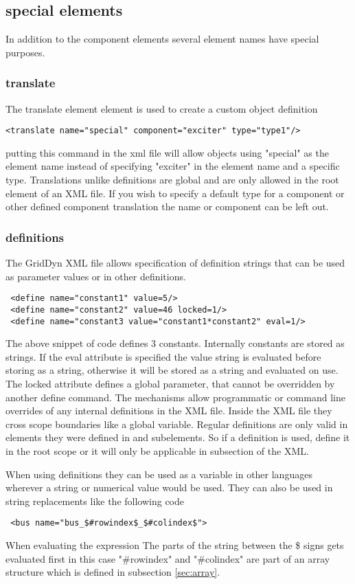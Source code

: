 \documentclass[12pt]{article} %
\begin{document}
\subsection{special elements}
In addition to the component elements several element names have special purposes.
\subsubsection{translate}
The translate element element is used to create a custom object definition
\begin{lstlisting}
<translate name="special" component="exciter" type="type1"/>
\end{lstlisting}
putting this command in the xml file will allow objects using "special" as the element name instead of specifying "exciter" in the element name and a specific type.  Translations unlike definitions are global and are only allowed in the root element of an XML file.  If you wish to specify a default type for a component or other defined component translation the name or component can be left out.

\subsubsection{definitions}
The GridDyn XML file allows specification of definition strings that can be used as parameter values or in other definitions.
 \begin{lstlisting}
 <define name="constant1" value=5/>
 <define name="constant2" value=46 locked=1/>
 <define name="constant3 value="constant1*constant2" eval=1/>
 \end{lstlisting}

 The above snippet of code defines 3 constants.  Internally constants are stored as strings.  If the eval attribute is specified the value string is evaluated before storing as a string, otherwise it will be stored as a string and evaluated on use.   The locked attribute defines a global parameter, that cannot be overridden by another define command.  The mechanisms allow programmatic or command line overrides of any internal definitions in the XML file.  Inside the XML file they cross scope boundaries like a global variable.  Regular definitions are only valid in elements they were defined in and subelements.  So if a definition is used, define it in the root scope or it will only be applicable in subsection of the XML.

 When using definitions they can be used as a variable in other languages wherever a string or numerical value would be used.  They can also be used in string replacements like the following code
 \begin{lstlisting}
 <bus name="bus_$#rowindex$_$#colindex$">
 \end{lstlisting}
 When evaluating the expression The parts of the string between the \$ signs gets evaluated first in this case "\#rowindex" and "\#colindex" are part of an array structure which is defined in subsection \ref{sec:array}.
\end{document}
